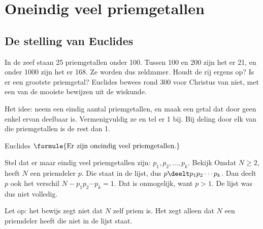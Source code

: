 
\begin{oefeningen}
\end{oefeningen}

\section{Oneindig veel priemgetallen}

\subsection{De stelling van Euclides}

In de zeef staan 25 priemgetallen onder 100. Tussen 100 en 200 zijn het er 21, en onder 1000 zijn het er 168. Ze worden dus zeldzamer. Houdt de rij ergens op? Is er een grootste priemgetal? Euclides bewees rond 300 voor Christus van niet, met een van de mooiste bewijzen uit de wiskunde.

Het idee: neem een eindig aantal priemgetallen, en maak een getal dat door geen enkel ervan deelbaar is. Vermenigvuldig ze en tel er 1 bij. Bij deling door elk van die priemgetallen is de rest dan 1.

\begin{theorie}
\begin{stelling}{Euclides}
\qquad $\formule{\text{Er zijn oneindig veel priemgetallen.}}$
\end{stelling}

\begin{bewijs}
Stel dat er maar eindig veel priemgetallen zijn: $p_1, p_2, \ldots, p_k$. Bekijk
Omdat $N \geqslant 2$, heeft $N$ een priemdeler $p$. Die staat in de lijst, dus $p \deelt p_1 p_2 \cdots p_k$. Dan deelt $p$ ook het verschil $N - p_1 p_2 \cdots p_k = 1$. Dat is onmogelijk, want $p > 1$. De lijst was dus niet volledig.
\end{bewijs}
\end{theorie}

Let op: het bewijs zegt niet dat $N$ zelf priem is. Het zegt alleen dat $N$ een priemdeler heeft die niet in de lijst staat.


